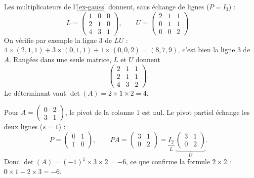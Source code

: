 \begin{example}
Les multiplicateurs de l'\cref{ex-gauss} donnent,
sans échange de lignes ($P = I_3$) :
\[
    L = \begin{pmatrix} 1 & 0 & 0 \\ 2 & 1 & 0 \\ 4 & 3 & 1 \end{pmatrix},
    \qquad
    U = \begin{pmatrix} 2 & 1 & 1 \\ 0 & 1 & 1 \\ 0 & 0 & 2 \end{pmatrix}.
\]
On vérifie par exemple la ligne $3$ de $LU$ :
$4 \times (2, 1, 1) + 3 \times (0, 1, 1) + 1 \times (0, 0, 2)
= (8, 7, 9)$, c'est bien la ligne $3$ de $A$. Rangées
dans une seule matrice, $L$ et $U$ donnent
\[
    \begin{pmatrix} 2 & 1 & 1 \\ 2 & 1 & 1 \\ 4 & 3 & 2 \end{pmatrix}.
\]
Le déterminant vaut $\det(A) = 2 \times 1 \times 2 = 4$.
\end{example}

\begin{example}
Pour
$A = \begin{pmatrix} 0 & 2 \\ 3 & 1 \end{pmatrix}$,
le pivot de la colonne $1$ est nul. Le pivot partiel
échange les deux lignes ($s = 1$) :
\[
    P = \begin{pmatrix} 0 & 1 \\ 1 & 0 \end{pmatrix},
    \qquad
    PA = \begin{pmatrix} 3 & 1 \\ 0 & 2 \end{pmatrix}
    = \underbrace{I_2}_{L}\ \underbrace{\begin{pmatrix} 3 & 1 \\ 0 & 2 \end{pmatrix}}_{U}.
\]
Donc $\det(A) = (-1)^1 \times 3 \times 2 = -6$, ce que
confirme la formule $2 \times 2$ :
$0 \times 1 - 2 \times 3 = -6$.
\end{example}

